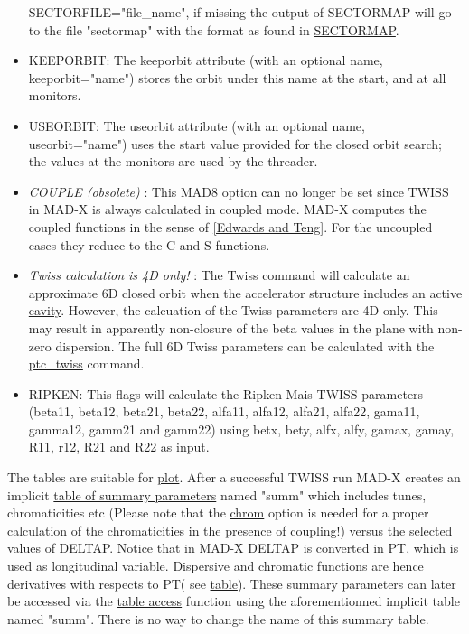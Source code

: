\begin{itemize}
          SECTORFILE="file\_name", if missing the output of SECTORMAP
          will go to the file "sectormap" with the format as found in
          \href{../Introduction/sectormap.html}{SECTORMAP}.    
	\item KEEPORBIT: The keeporbit attribute (with an optional name,
          keeporbit="name") stores the orbit under this name at the
          start, and at all monitors.    
	\item USEORBIT: The useorbit attribute (with an optional name,
          useorbit="name") uses the start value provided for the closed
          orbit search; the values at the monitors are used by the
          threader.    
	\item \textit{COUPLE (obsolete)} : This MAD8 option can no
          longer be set since TWISS in MAD-X is always calculated in
          coupled mode. MAD-X computes the coupled functions in the
          sense of
          \href{../Introduction/bibliography.html#edwards}{[Edwards and
              Teng]}. For the uncoupled cases they reduce to the C and S
          functions.    
	\item \textit{ Twiss calculation is 4D only!} : The Twiss
          command will calculate an approximate 6D closed orbit when the
          accelerator structure includes an active
          \href{../Introduction/cavity.html}{cavity}. However, the
          calcuation of the Twiss parameters are 4D only. This may
          result in apparently non-closure of the beta values in the
          plane with non-zero dispersion. The full 6D Twiss parameters
          can be calculated with the
          \href{../ptc_twiss/ptc_twiss.html}{ptc\_twiss} command.    
	\item RIPKEN: This flags will calculate the Ripken-Mais TWISS
          parameters (beta11, beta12, beta21, beta22, alfa11, alfa12,
          alfa21, alfa22, gama11, gamma12, gamm21 and gamm22) using
          betx, bety, alfx, alfy, gamax, gamay, R11, r12, R21 and R22 as
          input.  
\end{itemize}

The tables are suitable for \href{../plot/plot.html}{plot}.   After a
successful TWISS run MAD-X creates an implicit
\href{../Introduction/tables.html#summ}{table of summary parameters}
named "summ" which includes tunes, chromaticities etc (Please note that
the \href{../Introduction/tables.html#chrom}{chrom} option is needed
for a proper calculation of the chromaticities in the presence of
coupling!) versus the selected values of DELTAP. Notice that in MAD-X
DELTAP is converted in PT, which is used as longitudinal
variable. Dispersive and chromatic functions are hence derivatives with
respects to PT( see
\href{../Introduction/tables.html#summ}{table}). These summary
parameters can later be accessed via the
\href{../Introduction/expression.html#table}{table access} function
using the aforementionned implicit table named "summ". There is no way
to change the name of this summary table.  

